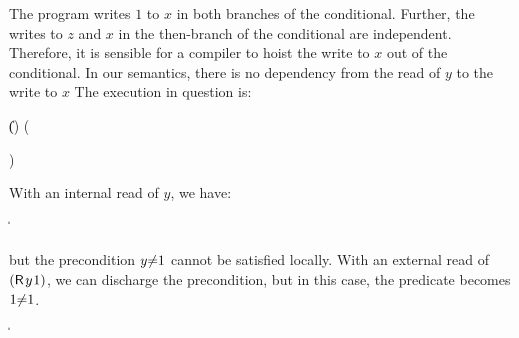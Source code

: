 The program writes $1$ to $x$ in both branches of the conditional.  Further,
the writes to $z$ and $x$ in the then-branch of the conditional are
independent.  Therefore, it is sensible for a compiler to hoist the write to
$x$ out of the conditional.  In our semantics, there is no dependency from
the read of $y$ to the write to $x$
The execution in question is:
\begin{displaymathsmall}
  \begin{tikzcenter}[node distance=1.5em]
  \end{tikzcenter}
  \Bigm\|
  ()
  \prefix
  \left(
    \begin{tikzcenter}[node distance=.5em]
    \end{tikzcenter}
  \right)
\end{displaymathsmall}
With an internal read of $y$, we have:
\begin{displaymathsmall}
  \begin{tikzcenter}[node distance=1.5em]
  \end{tikzcenter}
  \Bigm\|
    \begin{tikzcenter}[node distance=1.5em]
    \end{tikzcenter}
\end{displaymathsmall}
but the precondition $y{\neq}1$ cannot be satisfied locally.
With an external read of $(\DR{y}{1})$, we can discharge the precondition, but in this
case, the predicate becomes $1{\neq} 1$. 
\begin{displaymathsmall}
  \begin{tikzcenter}[node distance=1.5em]
  \end{tikzcenter}
  \Bigm\|  
    \begin{tikzcenter}[node distance=1.5em]
    \end{tikzcenter}
\end{displaymathsmall}


